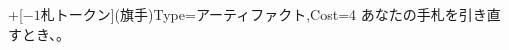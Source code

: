 \documentclass[landscape,grid]{waku}
\begin{document}
\def\Expantion{ルネサンス}\def\errata{2019}
+[\(-\text{1}\)札トークン](旗手){Type=アーティファクト,Cost=4}{
	あなたの手札を引き直すとき、。
}
\end{document}
